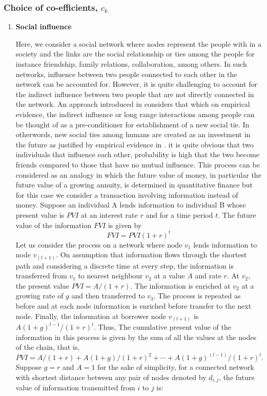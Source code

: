 \documentclass[10pt,a4paper]{article}
\theoremstyle{plain}
\theoremstyle{definition}
\begin{document}
        \subsubsection{Choice of co-efficients, $c_k$}
        \begin{enumerate}[1)]
        	\item \textbf{Social influence }
        	  	
    	    	Here, we consider a social network where nodes represent the people with in a society and the links are the social relationship or ties among the people for instance friendship, family relations, collaboration, among others. In such networks, influence between two people connected to each other in the network can be accounted for. However, it is quite challenging to account for the indirect influence between two people that are not directly connected in the network. An approach introduced in \citep{estrada2011epidemic}considers that which on empirical evidence, the indirect influence or long range interactions among people can be thought of as a pre-conditioner for establishment of a new social tie. In otherwords, new social ties among humans are created as an investment in the future as justified by empirical evidence in \citep{estrada2011epidemic}. it is quite obvious that two individuals that influence each other, probability is high that the two become friends compared to those that have no mutual influence. This process can be considered as an analogy in which the future value of money, in particular the future value of a growing annuity, is determined in quantitative finance but for this case we consider a transaction involving information instead of money. Suppose an individual A lends information to individual B whose present value is $PVI$ at an interest rate $r$ and for a time period $t$. The future value of the information $FVI$ is given by
    	    	\begin{equation}
    	    	FVI = PVI (1+r)^t
    	    	\end{equation}
    	    	Let us consider the process on a network where node $v_1$ lends information to node $v_(l+1)$. On assumption that information flows through the shortest path and considering a discrete time at every step, the information is transferred from $v_1$ to nearest neighbour $v_2$ at a value $A$ and rate $r$. At $v_2$, the present value $PVI=A/(1+r)$. The information is enriched at $v_2$ at a growing rate of $g$ and then transferred to $v_3$. The process is repeated as before and at each node information is enriched before transfer to the next node. Finally, the information at borrower node $v_(l+1)$ is $A ( 1 + g )^ {l -1} /( 1 + r )^l$. Thus, The cumulative present
    	    	value of the information in this process is given by the sum of all the values at the nodes of the chain, that is,
    	    	\begin{equation}
    	    	PVI
    	    	= A /( 1 + r ) + A ( 1 + g )/( 1 + r )^2 + \cdots + A ( 1 + g )^(l -1) /( 1 + r )^l .
    	    	\end{equation}
    	    	Suppose $g=r$ and $A=1$ for the sake of simplicity, for a connected network with shortest distance between any pair of nodes denoted by $d_{i,j}$, the future value of information transmitted from $i$ to $j$ is:
    	    	

\end{enumerate}
\end{document}
